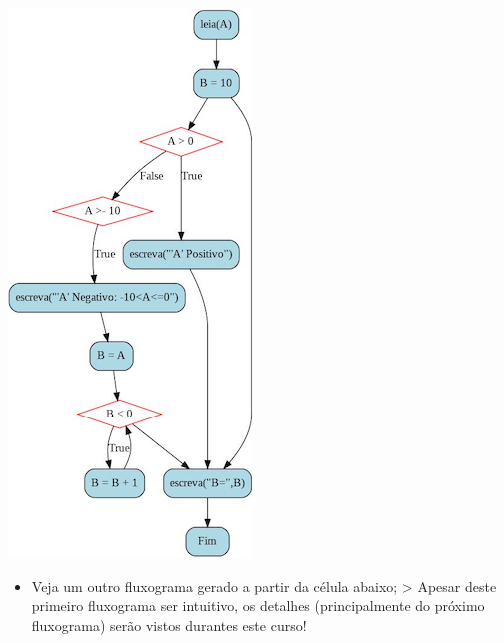 \documentclass[12pt,a4paper]{article}
\providecommand{\tightlist}{%
      \setlength{\itemsep}{0pt}\setlength{\parskip}{0pt}}
\begin{document}
    \includegraphics{"figs/flowchart2.jpg"}

\begin{itemize}
\tightlist
\item
  Veja um outro fluxograma gerado a partir da célula abaixo;
  \textgreater{} Apesar deste primeiro fluxograma ser intuitivo, os
  detalhes (principalmente do próximo fluxograma) serão vistos durantes
  este curso!
\end{itemize}
\end{document}
